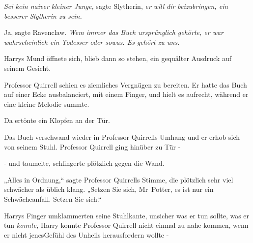\emph{Sei kein naiver kleiner Junge,} sagte Slytherin, \emph{er} \emph{will} \emph{dir beizubringen, ein} \emph{besserer} \emph{Slytherin zu sein.}

Ja, sagte Ravenclaw. \emph{Wem immer das Buch ursprünglich gehörte, er war wahrscheinlich ein Todesser oder sowas. Es gehört zu uns.}

Harrys Mund öffnete sich, blieb dann so stehen, ein gequälter Ausdruck auf seinem Gesicht.

Professor Quirrell schien es ziemliches Vergnügen zu bereiten. Er hatte das Buch auf einer Ecke ausbalanciert, mit einem Finger, und hielt es aufrecht, während er eine kleine Melodie summte.

Da ertönte ein Klopfen an der Tür.

Das Buch verschwand wieder in Professor Quirrells Umhang und er erhob sich von seinem Stuhl. Professor Quirrell ging hinüber zu Tür -

- und taumelte, schlingerte plötzlich gegen die Wand.

„Alles in Ordnung,“ sagte Professor Quirrells Stimme, die plötzlich sehr viel schwächer als üblich klang. „Setzen Sie sich, Mr~Potter, es ist nur ein Schwächeanfall. Setzen Sie sich.“

Harrys Finger umklammerten seine Stuhlkante, unsicher was er tun sollte, was er tun \emph{konnte,} Harry konnte Professor Quirrell nicht einmal zu nahe kommen, wenn er nicht jenesGefühl des Unheils herausfordern wollte -

